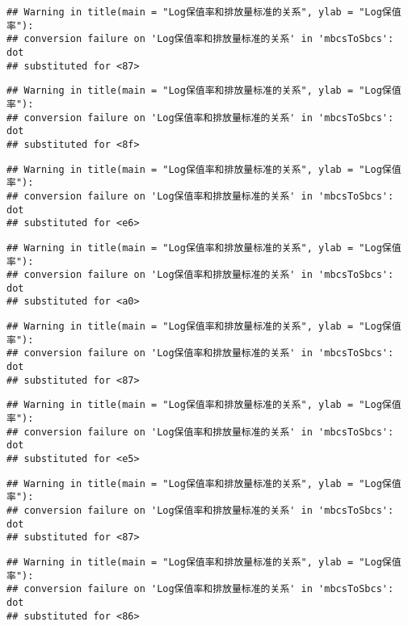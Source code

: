 \documentclass[]{article}
\begin{document}
\begin{verbatim}
## Warning in title(main = "Log保值率和排放量标准的关系", ylab = "Log保值率"):
## conversion failure on 'Log保值率和排放量标准的关系' in 'mbcsToSbcs': dot
## substituted for <87>
\end{verbatim}

\begin{verbatim}
## Warning in title(main = "Log保值率和排放量标准的关系", ylab = "Log保值率"):
## conversion failure on 'Log保值率和排放量标准的关系' in 'mbcsToSbcs': dot
## substituted for <8f>
\end{verbatim}

\begin{verbatim}
## Warning in title(main = "Log保值率和排放量标准的关系", ylab = "Log保值率"):
## conversion failure on 'Log保值率和排放量标准的关系' in 'mbcsToSbcs': dot
## substituted for <e6>
\end{verbatim}

\begin{verbatim}
## Warning in title(main = "Log保值率和排放量标准的关系", ylab = "Log保值率"):
## conversion failure on 'Log保值率和排放量标准的关系' in 'mbcsToSbcs': dot
## substituted for <a0>
\end{verbatim}

\begin{verbatim}
## Warning in title(main = "Log保值率和排放量标准的关系", ylab = "Log保值率"):
## conversion failure on 'Log保值率和排放量标准的关系' in 'mbcsToSbcs': dot
## substituted for <87>
\end{verbatim}

\begin{verbatim}
## Warning in title(main = "Log保值率和排放量标准的关系", ylab = "Log保值率"):
## conversion failure on 'Log保值率和排放量标准的关系' in 'mbcsToSbcs': dot
## substituted for <e5>
\end{verbatim}

\begin{verbatim}
## Warning in title(main = "Log保值率和排放量标准的关系", ylab = "Log保值率"):
## conversion failure on 'Log保值率和排放量标准的关系' in 'mbcsToSbcs': dot
## substituted for <87>
\end{verbatim}

\begin{verbatim}
## Warning in title(main = "Log保值率和排放量标准的关系", ylab = "Log保值率"):
## conversion failure on 'Log保值率和排放量标准的关系' in 'mbcsToSbcs': dot
## substituted for <86>
\end{verbatim}
\end{document}
